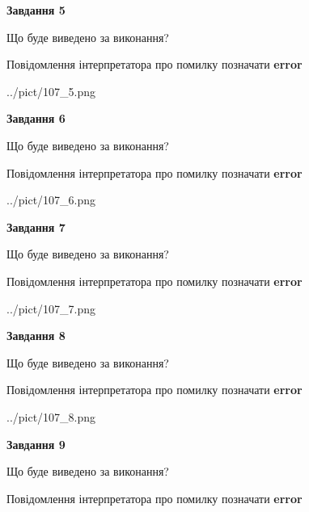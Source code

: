 \documentclass[11pt, ukrainian]{article}
\begin{document}
{\begin {large}
{\begin {center}\textbf{Завдання 5}\end {center}}\par
Що буде виведено за виконання? \par
Повідомлення інтерпретатора про помилку позначати \textbf{error}

\begin{center}
	{../pict/107_5.png}
\end{center}
\newpage

{\begin {center}\textbf{Завдання 6}\end {center}}\par
Що буде виведено за виконання? \par
Повідомлення інтерпретатора про помилку позначати \textbf{error}

\begin{center}
	{../pict/107_6.png}
\end{center}
\newpage

{\begin {center}\textbf{Завдання 7}\end {center}}\par
Що буде виведено за виконання? \par
Повідомлення інтерпретатора про помилку позначати \textbf{error}

\begin{center}
	{../pict/107_7.png}
\end{center}
\newpage

{\begin {center}\textbf{Завдання 8}\end {center}}\par
Що буде виведено за виконання? \par
Повідомлення інтерпретатора про помилку позначати \textbf{error}

\begin{center}
	{../pict/107_8.png}
\end{center}
\newpage

{\begin {center}\textbf{Завдання 9}\end {center}}\par
Що буде виведено за виконання? \par
Повідомлення інтерпретатора про помилку позначати \textbf{error}


\end{large}}
\end{document}
